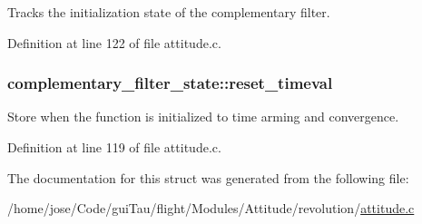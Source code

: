 Tracks the initialization state of the complementary filter. 



Definition at line 122 of file attitude.\-c.

\hypertarget{structcomplementary__filter__state_a5b8422bb68fa412d1ff92c82331c18ec}{
\subsubsection[{reset\-\_\-timeval}]{ complementary\-\_\-filter\-\_\-state\-::reset\-\_\-timeval}}\label{structcomplementary__filter__state_a5b8422bb68fa412d1ff92c82331c18ec}


Store when the function is initialized to time arming and convergence. 



Definition at line 119 of file attitude.\-c.



The documentation for this struct was generated from the following file\-:\begin{DoxyCompactItemize}
\item 
/home/jose/\-Code/gui\-Tau/flight/\-Modules/\-Attitude/revolution/\hyperlink{revolution_2attitude_8c}{attitude.\-c}\end{DoxyCompactItemize}
